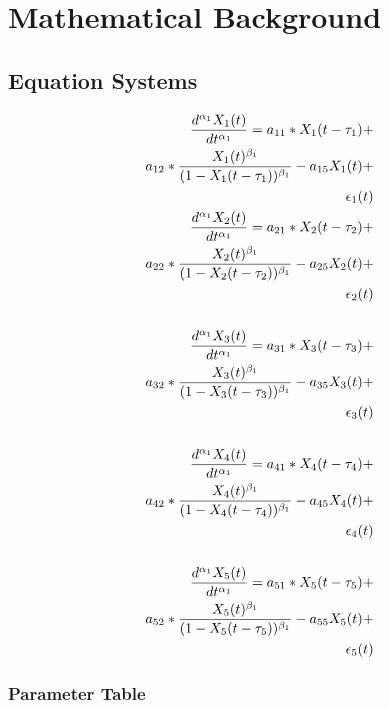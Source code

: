 \documentclass[preprint, 8pt]{elsarticle}
\theoremstyle{definition}
\begin{document}
\section{Mathematical Background}

\subsection{Equation Systems}

\begin{align*} 
\tiny
\frac{d^{\alpha_1}X_1(t)}{dt^{\alpha_1}} = a_{11} *X_1(t - \tau_1) + \\
a_{12} *\frac{X_1(t)^{\beta_1}}{(1-X_1(t - \tau_1))^{\beta_1}} - a_{15}X_1(t) + \\
\epsilon_1(t) \\
\frac{d^{\alpha_1}X_2(t)}{dt^{\alpha_1}} = a_{21} *X_2(t - \tau_2) + \\
a_{22} *\frac{X_2(t)^{\beta_1}}{(1-X_2(t - \tau_2))^{\beta_1}} - a_{25}X_2(t) + \\
\epsilon_2(t) \\ \\
\frac{d^{\alpha_1}X_3(t)}{dt^{\alpha_1}} = a_{31} *X_3(t - \tau_3) + \\
a_{32} *\frac{X_3(t)^{\beta_1}}{(1-X_3(t - \tau_3))^{\beta_1}} - a_{35}X_3(t) + \\
\epsilon_3(t) \\ \\
\frac{d^{\alpha_1}X_4(t)}{dt^{\alpha_1}} = a_{41} *X_4(t - \tau_4) + \\
a_{42} *\frac{X_4(t)^{\beta_1}}{(1-X_4(t - \tau_4))^{\beta_1}} - a_{45}X_4(t) + \\
\epsilon_4(t) \\ \\
\frac{d^{\alpha_1}X_5(t)}{dt^{\alpha_1}} = a_{51} *X_5(t - \tau_5) + \\
a_{52} *\frac{X_5(t)^{\beta_1}}{(1-X_5(t - \tau_5))^{\beta_1}} - a_{55}X_5(t) + \\
\epsilon_5(t) \\
\end{align*}

\subsubsection{Parameter Table}
\end{document}
